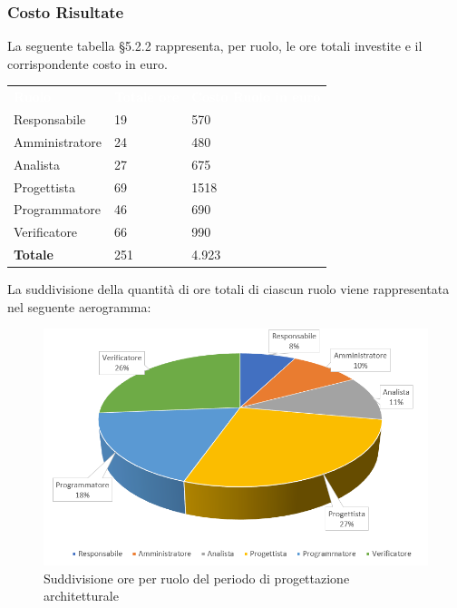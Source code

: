 \subsubsection{Costo Risultate}
La seguente tabella §5.2.2 rappresenta, per ruolo, le ore totali investite e il corrispondente costo in euro.
{
	\renewcommand{\arraystretch}{2}
	\centering
	\begin{longtable}{ C{3cm} C{2cm} C{4cm}}
		\textcolor{white}{\textbf{Ruolo}} & \textcolor{white}{\textbf{Totale ore}} & \textcolor{white}{\textbf{Costo Ruolo in euro}}\\	
        
        Responsabile & 19 & 570 \\
        Amministratore & 24 & 480 \\
        Analista & 27 & 675 \\
        Progettista & 69 & 1518 \\
        Programmatore & 46 & 690 \\
        Verificatore & 66 & 990 \\
        \textbf{Totale} & 251 & 4.923 \\
		
	\end{longtable}
}

La suddivisione della quantità di ore totali di ciascun ruolo viene rappresentata nel seguente aerogramma:

\begin{figure}[h]
	\centering
	\includegraphics[scale=2]{sezioni/Aerogrammi/AerogrammaProgettArchitetturale.png}
	\caption{Suddivisione ore per ruolo del periodo di progettazione architetturale}
\end{figure}

